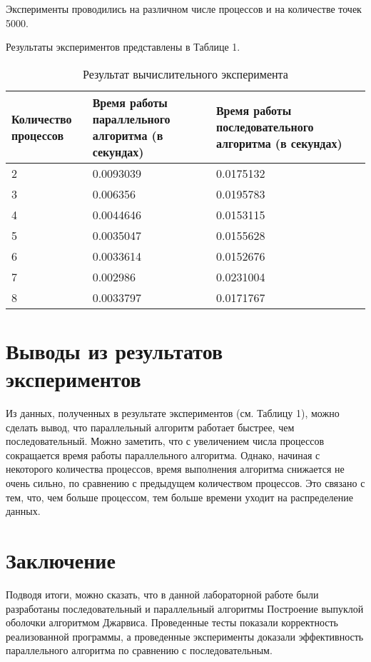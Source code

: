 \documentclass{report}
\begin{document}
\par Эксперименты проводились на различном числе процессов и на количестве точек 5000.

\par Результаты экспериментов представлены в Таблице 1.

\begin{table}[!h]
\caption{Результат вычислительного эксперимента}
\centering
\begin{tabular}{| p{2cm} | p{3cm} | p{4cm} | p{2cm} |}
\hline
Количество процессов & Время работы параллельного алгоритма (в секундах) & Время работы последовательного алгоритма (в секундах)   \\[5pt]
\hline
2        & 0.0093039        & 0.0175132            \\
3        & 0.006356         & 0.0195783            \\
4        & 0.0044646        & 0.0153115            \\
5        & 0.0035047        & 0.0155628            \\
6        & 0.0033614        & 0.0152676            \\
7        & 0.002986         & 0.0231004            \\
8        & 0.0033797        & 0.0171767            \\

\hline
\end{tabular}
\end{table}

\newpage

\section*{Выводы из результатов экспериментов}
Из данных, полученных в результате экспериментов (см. Таблицу 1), можно сделать вывод, что параллельный алгоритм работает быстрее, чем последовательный. Можно заметить, что с увеличением числа процессов сокращается время работы параллельного алгоритма. Однако, начиная с некоторого количества процессов, время выполнения алгоритма снижается не очень сильно, по сравнению с предыдущем количеством процессов. Это связано с тем, что, чем больше процессом, тем больше времени уходит на распределение данных. 

\newpage

\section*{Заключение}
Подводя итоги, можно сказать, что в данной лабораторной работе были разработаны последовательный и параллельный алгоритмы Построение выпуклой оболочки алгоритмом Джарвиса. Проведенные тесты показали корректность реализованной программы, а проведенные эксперименты доказали эффективность параллельного алгоритма по сравнению с последовательным.
\newpage
\end{document}

